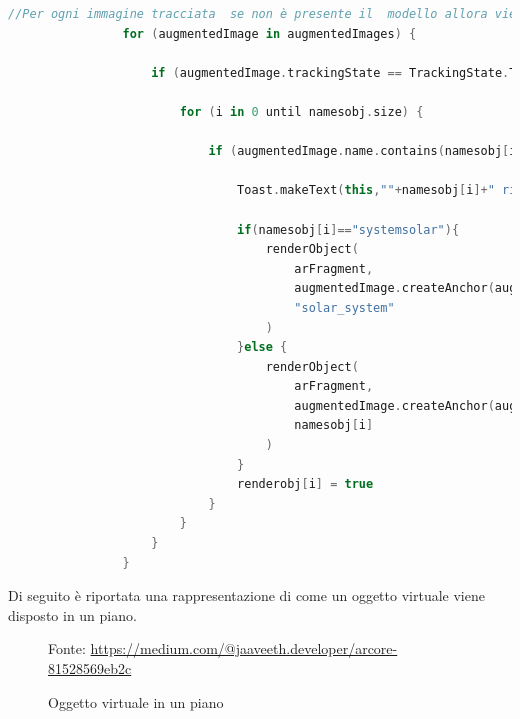 \documentclass[crop=false, class=book]{standalone}
\begin{document}
		\begin{center}
			\begin{minipage}{1.1\textwidth}
				\begin{lstlisting}[caption={Definizione Anchor in Augmented Images}, label={lst: Definizione Anchor in Augmented Images}, language=Kotlin]
				//Per ogni immagine tracciata  se non è presente il  modello allora viene immediatamente costruito e instanziato
        		for (augmentedImage in augmentedImages) {

            		if (augmentedImage.trackingState == TrackingState.TRACKING) {

                		for (i in 0 until namesobj.size) {

                    		if (augmentedImage.name.contains(namesobj[i]) && !renderobj[i]) {

                        		Toast.makeText(this,""+namesobj[i]+" rilevato",Toast.LENGTH_SHORT).show()

                        		if(namesobj[i]=="systemsolar"){
                            		renderObject(
                                		arFragment,
                                		augmentedImage.createAnchor(augmentedImage.centerPose),
                                		"solar_system"
                            		)
                        		}else {
                            		renderObject(
                                		arFragment,
                                		augmentedImage.createAnchor(augmentedImage.centerPose),
                                		namesobj[i]
                            		)
                        		}	
                        		renderobj[i] = true
                    		}
                		}
            		}
        		}
					\end{lstlisting}
			\end{minipage}
		\end{center}
	
		\clearpage
		
		\begin{flushleft}
			Di seguito è riportata una rappresentazione di come un oggetto virtuale viene disposto in un piano.
		\end{flushleft}
		\begin{figure}
				\centering
				{Fonte: \url{https://medium.com/@jaaveeth.developer/arcore-81528569eb2c}}
				\caption{Oggetto virtuale in un piano}
				\label{fig: Oggetto virtuale in un piano}
		\end{figure}	
\end{document}
